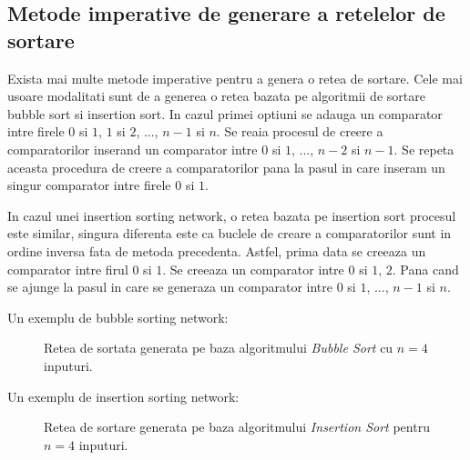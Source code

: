 \documentclass[12pt]{article}
\begin{document}
\subsection{Metode imperative de generare a retelelor de sortare}

Exista mai multe metode imperative pentru a genera o retea de sortare. Cele mai usoare modalitati sunt de a generea o 
retea bazata pe algoritmii de sortare bubble sort si insertion sort. In cazul primei optiuni se adauga un comparator intre
firele $0$ si $1$, $1$ si $2$, ..., $n-1$ si $n$. Se reaia procesul de creere a comparatorilor inserand un comparator intre $0$ si $1$, ..., $n-2$ si $n-1$. Se repeta aceasta procedura de creere a comparatorilor pana la pasul in care inseram un singur comparator intre firele $0$ si $1$.

In cazul unei insertion sorting network, o retea bazata pe insertion sort procesul este similar, singura diferenta este ca buclele de creare a comparatorilor sunt in ordine inversa fata de metoda precedenta. Astfel, prima data se creeaza un comparator 
intre firul $0$ si $1$. Se creeaza un comparator intre $0$ si $1$, $2$. Pana cand se ajunge la pasul in care se generaza un comparator intre $0$ si $1$, ..., $n-1$ si $n$. 

Un exemplu de bubble sorting network:

\begin{figure}
\centering
{}
\caption{Retea de sortata generata pe baza algoritmului \textit{Bubble Sort} cu $n=4$ inputuri. }
\end{figure}

Un exemplu de insertion sorting network:

\begin{figure}
\centering
{}
\caption{Retea de sortare generata pe baza algoritmului \textit{Insertion Sort} pentru $n=4$ inputuri.}
\end{figure}
\end{document}
